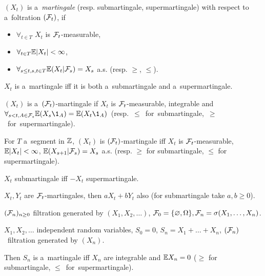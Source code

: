 	\pagebreak
	
	\begin{definition}[martingale]
		$(X_t)$ is a~\emph{martingale} (resp. submartingale, supermartingale)
		with respect to a~foltration $(\mathcal{F}_t)$, if 
		\begin{itemize}
			\item $\forall_{t \in T}$ $X_t$ is $\mathcal{F}_t$-measurable,
			\item $\forall_{t \in T} \mathbb{E} |X_t| < \infty$,
			\item $\forall_{s \leq t, s, t \in T} \mathbb{E}(X_t | \mathcal{F}_s) = X_s$ a.s. (resp. $\geq$, $\leq$).
		\end{itemize}
	\end{definition}
	
	\begin{remark}
		$X_t$ is a~martingale iff it is both a~submartingale and a~supermartingale.
	\end{remark}
	
	\begin{remark}
		$(X_t)$ is a~$(\mathcal{F}_t)$-martingale if $X_t$ is $\mathcal{F}_t$-measurable, integrable and \\ \mbox{$\forall_{s < t, A \in \F_s} \E(X_s \1_A) = \E(X_t \1_A)$ (resp. $\leq$ for submartingale, $\geq$ for supermartingale).}
	\end{remark}
	
	\begin{remark}
		For $T$ a~segment in ${\mathbb{Z}}$, $(X_t)$ is $(\mathcal{F}_t)$-martingale iff
		$X_t$ is $\mathcal{F}_t$-measurable, $\mathbb{E}|X_t|<\infty$, $\mathbb{E}(X_{s+1} | \mathcal{F}_s) = X_s$ a.s. (resp. $\geq$ for submartingale, $\leq$ for supermartingale).
	\end{remark}
	
	\begin{remark}
		$X_t$ submartingale iff $-X_t$ supermartingale.
	\end{remark}
	
	\begin{remark}
		$X_t, Y_t$ are $\mathcal{F}_t$-martingales, then $a X_t + b Y_t$ also (for submartingale take $a, b \geq 0$).
	\end{remark}
	
	\begin{definition}
		$(\mathcal{F}_n)_{n \geq 0}$ filtration generated by $(X_1, X_2, \ldots)$, $\mathcal{F}_0 = \{ \varnothing, \Omega\}, \mathcal{F}_n = \sigma(X_1, \ldots, X_n)$.
	\end{definition}
	
	\begin{fact}
		$X_1, X_2, \ldots$ independent random variables, $S_0 = 0$, $S_n = X_1 + \ldots + X_n$, \mbox{$(\mathcal{F}_n)$ filtration} generated by $(X_n)$.
		
		Then $S_n$ is a~martingale iff $X_n$ are integrable and $\mathbb{E} X_n = 0$ ($\geq$ for submartingale, \mbox{$\leq$ for supermartingale}).
	\end{fact}
	

